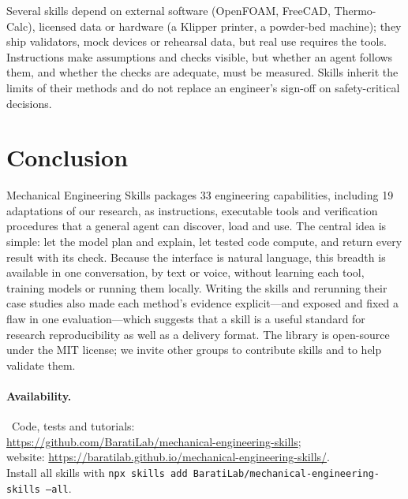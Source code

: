 \documentclass[11pt]{article}
\begin{document}
Several skills depend on external software (OpenFOAM, FreeCAD, Thermo-Calc), licensed data or
hardware (a Klipper printer, a powder-bed machine); they ship validators, mock devices or rehearsal
data, but real use requires the tools. Instructions make assumptions and checks visible, but
whether an agent follows them, and whether the checks are adequate, must be measured. Skills
inherit the limits of their methods and do not replace an engineer's sign-off on safety-critical
decisions.

\section{Conclusion}
Mechanical Engineering Skills packages 33 engineering capabilities, including 19 adaptations of our
research, as instructions, executable tools and verification procedures that a general agent can
discover, load and use. The central idea is simple: let the model plan and explain, let tested code
compute, and return every result with its check. Because the interface is natural language, this
breadth is available in one conversation, by text or voice, without learning each tool, training
models or running them locally. Writing the skills and rerunning their case studies also made each
method's evidence explicit---and exposed and fixed a flaw in one evaluation---which suggests that
a skill is a useful standard for research reproducibility as well as a delivery format. The library
is open-source under the MIT license; we invite other groups to contribute skills and to help
validate them.

\paragraph{Availability.}\sloppy\ Code, tests and tutorials:\\ \url{https://github.com/BaratiLab/mechanical-engineering-skills};\\ website: \url{https://baratilab.github.io/mechanical-engineering-skills/}.\\ Install all skills with
\texttt{npx skills add BaratiLab/mechanical-engineering-skills --all}.



\end{document}
